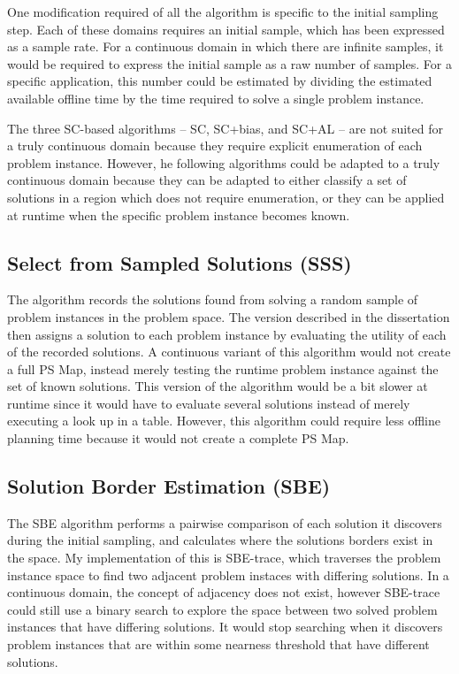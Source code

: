 One modification required of all the algorithm is specific to the initial sampling step.  Each of these domains requires an initial sample, which has been expressed as a sample rate.  For a continuous domain in which there are infinite samples, it would be required to express the initial sample as a raw number of samples.  For a specific application, this number could be estimated by dividing the estimated available offline time by the time required to solve a single problem instance.


 The three SC-based algorithms -- SC, SC+bias, and SC+AL -- are not suited for a truly continuous domain because they require explicit enumeration of each problem instance.  However, he following algorithms could be adapted to a truly continuous domain because they can be adapted to either classify a set of solutions in a region which does not require enumeration, or they can be applied at runtime when the specific problem instance becomes known.


\subsection{Select from Sampled Solutions (SSS)}
The algorithm records the solutions found from solving a random sample of problem instances in the problem space.  The version described in the dissertation then assigns a solution to each problem instance by evaluating the utility of each of the recorded solutions.  A continuous variant of this algorithm would not create a full PS Map, instead merely testing the runtime problem instance against the set of known solutions.  This version of the algorithm would be a bit slower at runtime since it would have to evaluate several solutions instead of merely executing a look up in a table.  However, this algorithm could require less offline planning time because it would not create a complete PS Map.


\subsection{Solution Border Estimation (SBE)}
The SBE algorithm performs a pairwise comparison of each solution it discovers during the initial sampling, and calculates where the solutions borders exist in the space.  My implementation of this is SBE-trace, which traverses the problem instance space to find two adjacent problem instaces with differing solutions.  In a continuous domain, the concept of adjacency does not exist, however SBE-trace could still use a binary search to explore the space between two solved problem instances that have differing solutions.  It would stop searching when it discovers problem instances that are within some nearness threshold that have different solutions.


